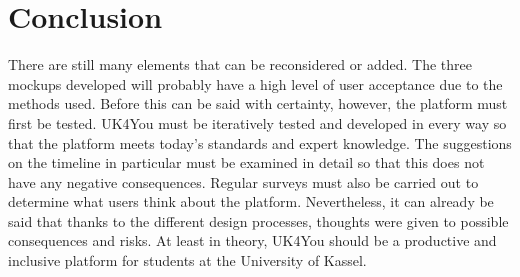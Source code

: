 \section{Conclusion}
There are still many elements that can be reconsidered or added.
The three mockups developed will probably have a high level of user acceptance due to the methods used.
Before this can be said with certainty, however, the platform must first be tested.
UK4You must be iteratively tested and developed in every way so that the platform meets today's standards and expert knowledge.
The suggestions on the timeline in particular must be examined in detail so that this does not have any negative consequences.
Regular surveys must also be carried out to determine what users think about the platform.
Nevertheless, it can already be said that thanks to the different design processes, thoughts were given to possible consequences and risks.
At least in theory, UK4You should be a productive and inclusive platform for students at the University of Kassel.
